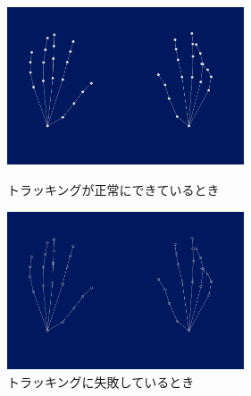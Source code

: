 \begin{figure}[htbp]
  \begin{minipage}[b]{0.5\linewidth}
    \centering
    \includegraphics[keepaspectratio, width=7cm]{img/track_true.png}
    \caption{トラッキングが正常にできているとき}
    \label{fig:track_true}
  \end{minipage}
  \begin{minipage}[b]{0.5\linewidth}
    \centering
    \includegraphics[keepaspectratio, width=7cm]{img/track_false.png}
    \caption{トラッキングに失敗しているとき}
    \label{fig:track_false}
  \end{minipage}
\end{figure}